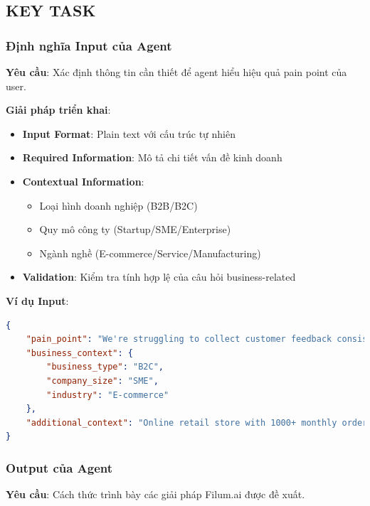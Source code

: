 \documentclass[12pt,a4paper]{article}
\begin{document}
\subsection{KEY TASK}
\subsubsection{Định nghĩa Input của Agent}

\textbf{Yêu cầu}: Xác định thông tin cần thiết để agent hiểu hiệu quả pain point của user.

\textbf{Giải pháp triển khai}:
\begin{itemize}
    \item \textbf{Input Format}: Plain text với cấu trúc tự nhiên
    \item \textbf{Required Information}: Mô tả chi tiết vấn đề kinh doanh
    \item \textbf{Contextual Information}: 
    \begin{itemize}
        \item Loại hình doanh nghiệp (B2B/B2C)
        \item Quy mô công ty (Startup/SME/Enterprise)
        \item Ngành nghề (E-commerce/Service/Manufacturing)
    \end{itemize}
    \item \textbf{Validation}: Kiểm tra tính hợp lệ của câu hỏi business-related
\end{itemize}

\textbf{Ví dụ Input}:
\begin{lstlisting}[language=json, caption=Ví dụ Input Pain Point]
{
    "pain_point": "We're struggling to collect customer feedback consistently after a purchase",
    "business_context": {
        "business_type": "B2C",
        "company_size": "SME",
        "industry": "E-commerce"
    },
    "additional_context": "Online retail store with 1000+ monthly orders"
}
\end{lstlisting}
\newpage
\subsubsection{ Output của Agent}

\textbf{Yêu cầu}: Cách thức trình bày các giải pháp Filum.ai được đề xuất.
\end{document}
